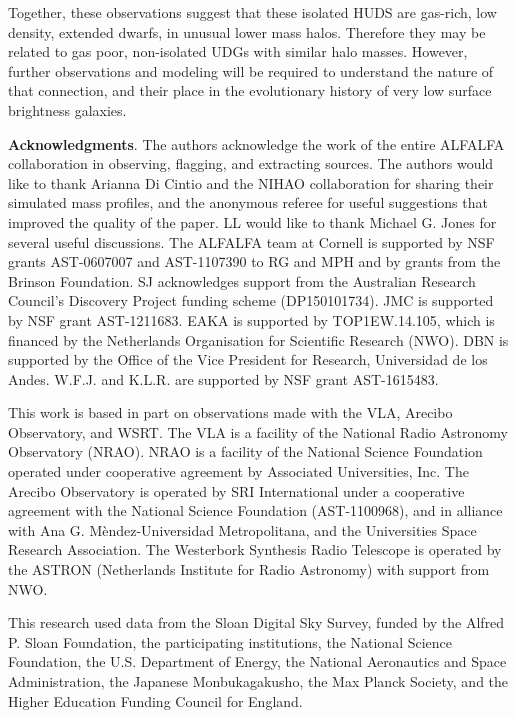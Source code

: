 \documentclass[twocolumn]{aastex6}
\begin{document}
\vskip -5pt
Together, these observations suggest that these isolated HUDS are gas-rich, low density, extended dwarfs, in unusual lower mass halos. Therefore they may be related to gas poor, non-isolated UDGs with similar halo masses. However, further observations and modeling will be required to understand the nature of that connection, and their place in the evolutionary history of very low surface brightness galaxies.


\acknowledgments
{\bf Acknowledgments}.  The authors acknowledge the work of the entire ALFALFA
collaboration in observing, flagging, and extracting sources. 
The authors would like to thank Arianna Di Cintio and the NIHAO collaboration for sharing their simulated mass profiles,
and the anonymous referee for useful suggestions that improved the quality of the paper. 
LL would like to thank Michael G. Jones for several useful discussions.
The ALFALFA team at Cornell is supported by NSF grants AST-0607007 
and AST-1107390 to RG and MPH and by grants from the Brinson Foundation. 
SJ acknowledges support from the Australian Research Council’s Discovery Project funding scheme (DP150101734).
JMC is supported by NSF grant AST-1211683. 
EAKA is supported by TOP1EW.14.105, which is financed by the Netherlands Organisation for Scientific Research (NWO).
DBN is supported by the Office of the Vice President for Research, Universidad de los Andes.
W.F.J. and K.L.R. are supported by NSF grant AST-1615483.

This work is based in part on observations made with the VLA, Arecibo Observatory, and WSRT.
The VLA is a facility of the National Radio Astronomy Observatory (NRAO). NRAO is a facility of the National Science Foundation operated under cooperative agreement by Associated Universities, Inc.  The Arecibo Observatory is operated by SRI International under a cooperative agreement with the National Science Foundation (AST-1100968), and in alliance with Ana G. M\`endez-Universidad Metropolitana, and the Universities Space Research Association. 
The Westerbork Synthesis Radio Telescope is operated by the ASTRON (Netherlands Institute for Radio Astronomy) with support from NWO.

This research used data from the Sloan Digital Sky Survey, funded by
the Alfred P. Sloan Foundation, the participating institutions, the
National Science Foundation, the U.S. Department of Energy, the
National Aeronautics and Space Administration, the Japanese
Monbukagakusho, the Max Planck Society, and the Higher Education
Funding Council for England.
\end{document}
